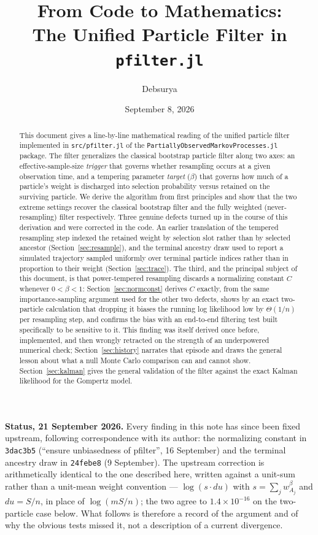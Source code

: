 \documentclass[11pt]{article}
\title{From Code to Mathematics: \\ The Unified Particle Filter in \texttt{pfilter.jl}}
\author{Debsurya}
\date{September 8, 2026}
\begin{document}
\maketitle

\begin{abstract}
This document gives a line-by-line mathematical reading of the unified particle
filter implemented in \texttt{src/pfilter.jl} of the \texttt{PartiallyObservedMarkovProcesses.jl}
package. The filter generalizes the classical bootstrap particle filter along two
axes: an effective-sample-size \emph{trigger} that governs whether resampling occurs
at a given observation time, and a tempering parameter \emph{target} ($\beta$) that
governs how much of a particle's weight is discharged into selection probability
versus retained on the surviving particle. We derive the algorithm from first
principles and show that the two extreme settings recover the classical
bootstrap filter and the fully weighted (never-resampling) filter
respectively. Three genuine defects turned up in the course of this
derivation and were corrected in the code. An earlier translation of the
tempered resampling step indexed the retained weight by selection slot
rather than by selected ancestor (Section~\ref{sec:resample}), and the
terminal ancestry draw used to report a simulated trajectory sampled
uniformly over terminal particle indices rather than in proportion to their
weight (Section~\ref{sec:trace}). The third, and the principal subject of
this document, is that power-tempered resampling discards a normalizing
constant $C$ whenever $0<\beta<1$: Section~\ref{sec:normconst} derives $C$
exactly, from the same importance-sampling argument used for the other two
defects, shows by an exact two-particle calculation that dropping it biases
the running log likelihood low by $\Theta(1/n)$ per resampling step, and
confirms the bias with an end-to-end filtering test built specifically to
be sensitive to it. This finding was itself derived once before, implemented,
and then wrongly retracted on the strength of an underpowered numerical
check; Section~\ref{sec:history} narrates that episode and draws the general
lesson about what a null Monte Carlo comparison can and cannot show.
Section~\ref{sec:kalman} gives the general validation of the filter against
the exact Kalman likelihood for the Gompertz model.
\end{abstract}
\vspace{0.6em}
\noindent\textbf{Status, 21 September 2026.}\; Every finding in this note has
since been fixed upstream, following correspondence with its author: the
normalizing constant in \texttt{3dac3b5} (``ensure unbiasedness of pfilter'',
16 September) and the terminal ancestry draw in \texttt{24febe8}
(9 September). The upstream correction is arithmetically identical to the one
described here, written against a unit-sum rather than a unit-mean weight
convention --- $\log(s\cdot du)$ with $s=\sum_j w_{A_j}^\beta$ and $du=S/n$,
in place of $\log(mS/n)$; the two agree to $1.4\times10^{-16}$ on the
two-particle case below. What follows is therefore a record of the argument
and of why the obvious tests missed it, not a description of a current
divergence.
\end{document}
